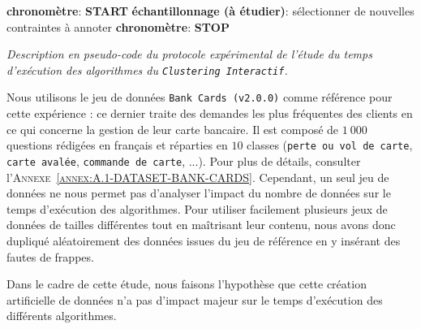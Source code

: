 \begin{algorithm}
{{						\textbf{chronomètre}: \textbf{START} \;
						\textbf{échantillonnage (à étudier)}: sélectionner de nouvelles contraintes à annoter \;
						\textbf{chronomètre}: \textbf{STOP} \;
					}
				}
				\caption{\textit{
					Description en pseudo-code du protocole expérimental de l'étude du temps d'exécution des algorithmes du \texttt{Clustering Interactif}.
				}}
				\label{algorithm:4.3.2-ETUDE-COUTS-TEMPS-CALCUL-PROTOCOLE}
			\end{algorithm}
			
			Nous utilisons le jeu de données \texttt{Bank Cards (v2.0.0)} comme référence pour cette expérience : ce dernier traite des demandes les plus fréquentes des clients en ce qui concerne la gestion de leur carte bancaire.
			Il est composé de $1~000$ questions rédigées en français et réparties en $10$ classes (\texttt{perte ou vol de carte}, \texttt{carte avalée}, \texttt{commande de carte}, ...).
			Pour plus de détails, consulter l'\textsc{Annexe~\ref{annex:A.1-DATASET-BANK-CARDS}}.
			Cependant, un seul jeu de données ne nous permet pas d'analyser l'impact du nombre de données sur le temps d'exécution des algorithmes.
			Pour utiliser facilement plusieurs jeux de données de tailles différentes tout en maîtrisant leur contenu, nous avons donc dupliqué aléatoirement des données issues du jeu de référence en y insérant des fautes de frappes.
			
			\begin{leftBarWarning}
				Dans le cadre de cette étude, nous faisons l'hypothèse que cette création artificielle de données n'a pas d'impact majeur sur le temps d'exécution des différents algorithmes.
			\end{leftBarWarning}
			
